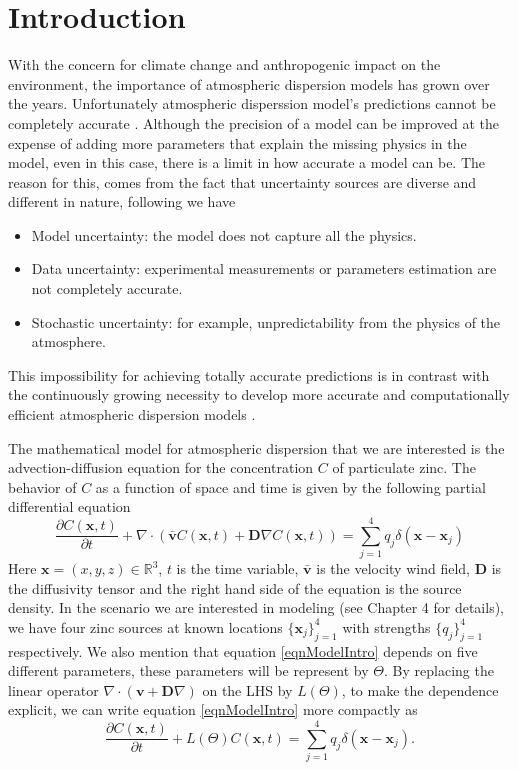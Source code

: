 \documentclass[12pt]{book}
\newcommand{\x}{\textbf{x}}
\newcommand{\vv}{\textbf{v}}
\newcommand{\dv}{\nabla\cdot}
\begin{document}
\chapter{Introduction}

With the concern for climate change and anthropogenic impact on the environment, 
the importance of atmospheric dispersion models has grown over the years. Unfortunately
atmospheric disperssion model's predictions cannot be  completely accurate \cite{chatwin1982use,lewellen1989meteorological}. 
Although the precision of a model can be improved at the expense
of adding more parameters that explain the missing physics in the model, even
in this case, there is a limit in how accurate a model can be.
The reason for this, comes from the fact that uncertainty sources
are diverse and different in nature, following  \cite{rao2005uncertainty}
we have 


\begin{itemize}
\item Model uncertainty: the model does not capture all the physics.
\item Data uncertainty: experimental measurements or parameters estimation are not completely accurate.
\item Stochastic uncertainty: for example, unpredictability from the physics of the atmosphere.
\end{itemize}
This impossibility for achieving totally accurate predictions
is in contrast with the continuously growing necessity to develop
more accurate and computationally efficient atmospheric dispersion models \cite{leelHossy2014dispersion}. 

The mathematical model for atmospheric dispersion that we are 
interested is the advection-diffusion equation
for the concentration $C$ of particulate zinc. The behavior of $C$
as a function of space and time is given by 
the following partial differential equation
\begin{equation}\label{eqnModelIntro}
\frac{\partial C(\x,t)}{\partial t}+\dv(\bar{\vv}C(\x,t)+\textbf{D}\nabla C(\x,t))=\sum_{j=1}^{4}q_{j}\delta(\x-\x_{j})
\end{equation}
Here $\x=(x,y,z)\in\mathbb{R}^{3}$, $t$ is the time variable, $\bar{\vv}$  is the velocity wind field, $\textbf{D}$
is the diffusivity tensor and the right hand side of the equation is the source density. In the scenario
we are interested in modeling (see Chapter 4 for details), we have four zinc sources at known locations $\{\x_{j}\}_{j=1}^{4}$ 
with strengths $\{q_{j}\}_{j=1}^{4}$ respectively. We also mention that equation \eqref{eqnModelIntro}
depends on five different parameters, these parameters will be represent by $\Theta$.
By replacing the linear operator $\dv(\vv+\textbf{D}\nabla)$ on the LHS by $L(\Theta)$, to make the dependence explicit, we can write equation \eqref{eqnModelIntro}
more compactly as
\begin{equation}\label{eqnParamtric}
\frac{\partial C(\x,t)}{\partial t}+L(\Theta)C(\x,t)=\sum_{j=1}^{4}q_{j}\delta(\x-\x_{j}).
\end{equation}
\end{document}
